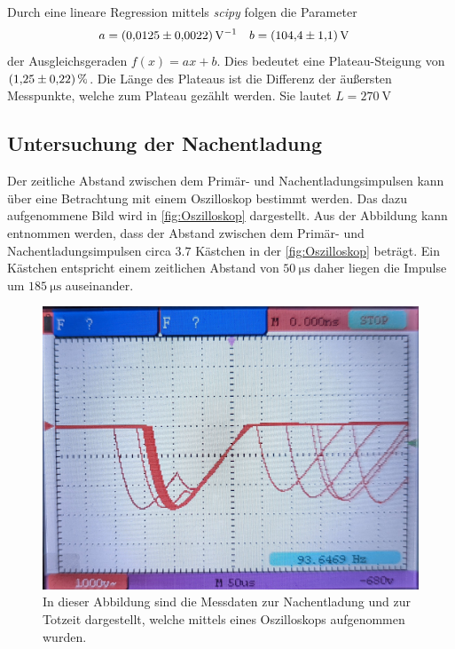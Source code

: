 Durch eine lineare Regression mittels \textit{scipy} \cite{scipy} folgen die Parameter
\begin{align*}
  a &= \qty{0.0125+-0.0022}{\volt^{-1}} & b &= \qty{104.4+-1.1}{\volt}
\end{align*}
der Ausgleichsgeraden $f(x) = ax + b$. Dies bedeutet eine Plateau-Steigung von $\qty{1.25+-0.22}{\percent}$. Die Länge des Plateaus ist die Differenz der äußersten Messpunkte,
welche zum Plateau gezählt werden. Sie lautet $L = \qty{270}{\volt}$

\subsection{Untersuchung der Nachentladung}
\label{subsec:Nachentladung}
Der zeitliche Abstand zwischen dem Primär- und Nachentladungsimpulsen kann über eine Betrachtung mit einem Oszilloskop bestimmt werden. Das dazu aufgenommene Bild wird in 
\autoref{fig:Oszilloskop} dargestellt. Aus der Abbildung kann entnommen werden, dass der Abstand zwischen dem Primär- und Nachentladungsimpulsen circa $\num{3.7}$ Kästchen 
in der \autoref{fig:Oszilloskop} beträgt. Ein Kästchen entspricht einem zeitlichen Abstand von $\qty{50}{\micro\second}$ daher liegen die Impulse um $\qty{185}{\micro\second}$
auseinander.
\begin{figure}
  \centering
  \includegraphics[width = .7\textwidth]{content/Oszilloskop_bild.jpg}
  \caption{In dieser Abbildung sind die Messdaten zur Nachentladung und zur Totzeit dargestellt, welche mittels eines Oszilloskops aufgenommen wurden.}
  \label{fig:Oszilloskop}
\end{figure}

